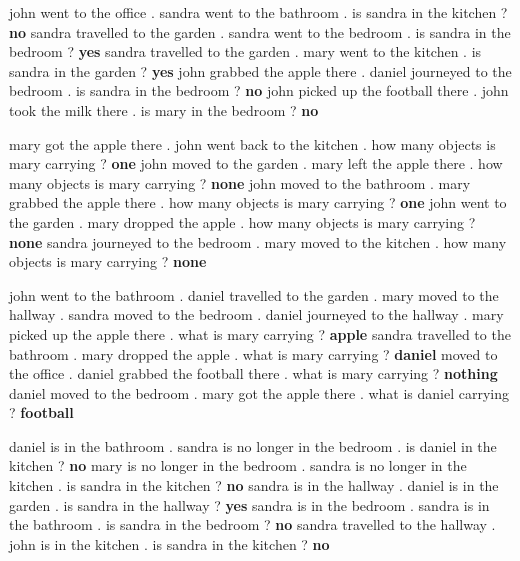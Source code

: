 \begin{table}[htb!]
\begin{tcbraster}[raster columns=2, size=minimal, raster valign=top]
\begin{tcolorbox}[mybox, title=Task 5: Three argument relations]
    \end{tcolorbox}  
    \begin{tcolorbox}[mybox, title=Task 6: Yes/No questions] 
    \tiny
 john went to the office . sandra went to the bathroom . is sandra in the kitchen ? \textbf{no} sandra travelled to the garden . sandra went to the bedroom . is sandra in the bedroom ? \textbf{yes} sandra travelled to the garden . mary went to the kitchen . is sandra in the garden ? \textbf{yes} john grabbed the apple there . daniel journeyed to the bedroom . is sandra in the bedroom ? \textbf{no} john picked up the football there . john took the milk there . is mary in the bedroom ? \textbf{no}
    \end{tcolorbox}    
    \begin{tcolorbox}[mybox, title=Task 7: Counting] 
    \tiny
mary got the apple there . john went back to the kitchen . how many objects is mary carrying ? \textbf{one} john moved to the garden . mary left the apple there . how many objects is mary carrying ? \textbf{none} john moved to the bathroom . mary grabbed the apple there . how many objects is mary carrying ? \textbf{one} john went to the garden . mary dropped the apple . how many objects is mary carrying ? \textbf{none} sandra journeyed to the bedroom . mary moved to the kitchen . how many objects is mary carrying ? \textbf{none}
    \end{tcolorbox}  
    \begin{tcolorbox}[mybox, title=Task 8: List/Sets] 
    \tiny
 john went to the bathroom . daniel travelled to the garden . mary moved to the hallway . sandra moved to the bedroom . daniel journeyed to the hallway . mary picked up the apple there . what is mary carrying ? \textbf{apple} sandra travelled to the bathroom . mary dropped the apple . what is mary carrying ?  \textbf{daniel} moved to the office . daniel grabbed the football there . what is mary carrying ? \textbf{nothing} daniel moved to the bedroom . mary got the apple there . what is daniel carrying ? \textbf{football} 
    \end{tcolorbox}    
    \begin{tcolorbox}[mybox, title=Task 9: Simple negation] 
    \tiny
daniel is in the bathroom . sandra is no longer in the bedroom . is daniel in the kitchen ? \textbf{no} mary is no longer in the bedroom . sandra is no longer in the kitchen . is sandra in the kitchen ? \textbf{no} sandra is in the hallway . daniel is in the garden . is sandra in the hallway ? \textbf{yes} sandra is in the bedroom . sandra is in the bathroom . is sandra in the bedroom ? \textbf{no} sandra travelled to the hallway . john is in the kitchen . is sandra in the kitchen ? \textbf{no}

\end{tcolorbox}
\end{tcbraster}
\end{table}
